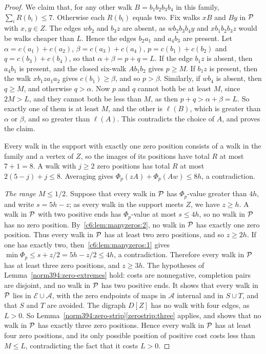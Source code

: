 \begin{proof}
We claim that, for any other walk $B=b_1b_2b_3b_4$ in this family, $\sum_iR(b_i)\le7$. Otherwise each $R(b_i)$ equals two.
Fix walks $xB$ and $By$ in $\mathcal P$ with $x,y\in Z$.
The edges $wb_2$ and $b_3z$ are absent, as $wb_2b_3b_4y$ and $xb_1b_2b_3z$ would be walks cheaper than $L$. Hence the edges $b_2a_1$ and $a_4b_3$ are present.
Let $\alpha=c(a_1)+c(a_2)$, $\beta=c(a_3)+c(a_4)$,
$p=c(b_1)+c(b_2)$ and $q=c(b_3)+c(b_4)$, so that $\alpha+\beta=p+q=L$.
If the edge $b_1z$ is absent, then $a_4b_1$ is present, and the closed six-walk $Ab_1b_2$ gives $p\ge M$. If $b_1z$ is present, then the walk $xb_1za_1a_2$ gives $c(b_1)\ge\beta$, and so $p>\beta$. Similarly, if $wb_4$ is absent, then $q\ge M$, and otherwise $q>\alpha$.
Now $p$ and $q$ cannot both be at least $M$, since $2M>L$, and they cannot both be less than $M$, as then $p+q>\alpha+\beta=L$. So exactly one of them is at least $M$, and the other is $\ell(B)$, which is greater than $\alpha$ or $\beta$, and so greater than $\ell(A)$. This contradicts the choice of $A$, and proves the claim.

Every walk in the support with exactly one zero position consists of a walk in the family and a vertex of $Z$, so the images of its positions have total $R$ at most $7+1=8$. A walk with $j\ge2$ zero positions has total $R$ at most $2(5-j)+j\le8$. Averaging gives
$\Phi_p(zA)+\Phi_p(Aw)\le8h$, a contradiction.

\emph{The range $M\le1/2$.}
Suppose that every walk in $\mathcal P$ has $\Phi_p$-value greater than $4h$, and
write $s=5h-z$; as every walk in the support meets $Z$, we have $z\ge h$.
A walk in $\mathcal P$ with two positive ends has $\Phi_p$-value at most $s\le4h$, so no walk in $\mathcal P$ has no zero position. By~\ref{c6:lem:manyzeros:2}, no walk in $\mathcal P$ has exactly one zero position. Thus every walk in $\mathcal P$ has at least two zero positions, and so $z\ge2h$.
If one has exactly two, then~\ref{c6:lem:manyzeros:1} gives
$\min\Phi_p\le s+z/2=5h-z/2\le4h$, a contradiction.
Therefore every walk in $\mathcal P$ has at least three zero positions, and $z\ge3h$.
The hypotheses of Lemma~\ref{norm394:zero-extremes} hold: costs are nonnegative, completion pairs are disjoint, and no walk in $\mathcal P$ has two positive ends. It shows that every walk in $\mathcal P$ lies in $\mathcal E\cup\mathcal A$, with the zero endpoints of maps in $\mathcal A$ internal and in $S\cup T$, and that $S$ and $T$ are avoided. The digraph $D[Z]$ has no walk with four edges, as $L>0$.
So Lemma~\ref{norm394:zero-strip}\ref{zerostrip:three} applies, and shows that no walk in $\mathcal P$ has exactly three zero positions. Hence every walk in $\mathcal P$ has at least four zero positions, and its only possible position of positive cost costs less than $M\le L$, contradicting the fact that it costs $L>0$.
\end{proof}

